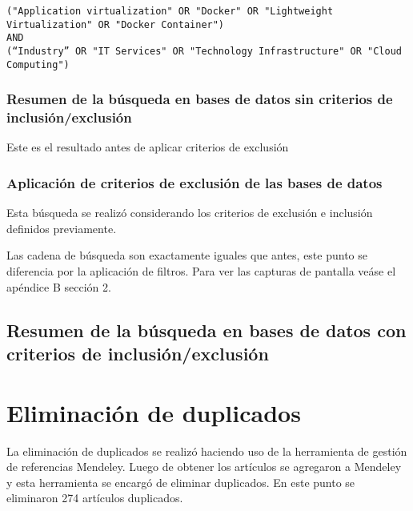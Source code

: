 \begin{tcolorbox}[
  colback=gray!5, 
  colframe=black!60, 
  title=Cadena de búsqueda en Taylor \& Francis para industria, 
  fonttitle=\bfseries, 
  sharp corners=south
]
\scriptsize %
\begin{verbatim}
("Application virtualization" OR "Docker" OR "Lightweight Virtualization" OR "Docker Container")  
AND 
(“Industry” OR "IT Services" OR "Technology Infrastructure" OR "Cloud Computing")
\end{verbatim}
\end{tcolorbox}

\subsubsection{Resumen de la búsqueda en bases de datos sin criterios de inclusión/exclusión}\label{subsubsec:resumenBusqueda}
Este es el resultado antes de aplicar criterios de exclusión




\subsubsection{Aplicación de criterios de exclusión de las bases de datos}
Esta búsqueda se realizó considerando los criterios de exclusión e inclusión definidos previamente.

Las cadena de búsqueda son exactamente iguales que antes, este punto se diferencia por la aplicación de 
filtros. Para ver las capturas de pantalla veáse el apéndice B sección 2.

\subsection{Resumen de la búsqueda en bases de datos con criterios de inclusión/exclusión}\label{subsec:resumenBusquedaCriterios}




\section{Eliminación de duplicados}\label{sec:eliminacionDuplicados}
La eliminación de duplicados se realizó haciendo uso de la herramienta de gestión de referencias Mendeley. Luego de obtener los artículos se agregaron a Mendeley y esta herramienta se encargó de eliminar duplicados. En este punto se eliminaron 274 artículos duplicados.

